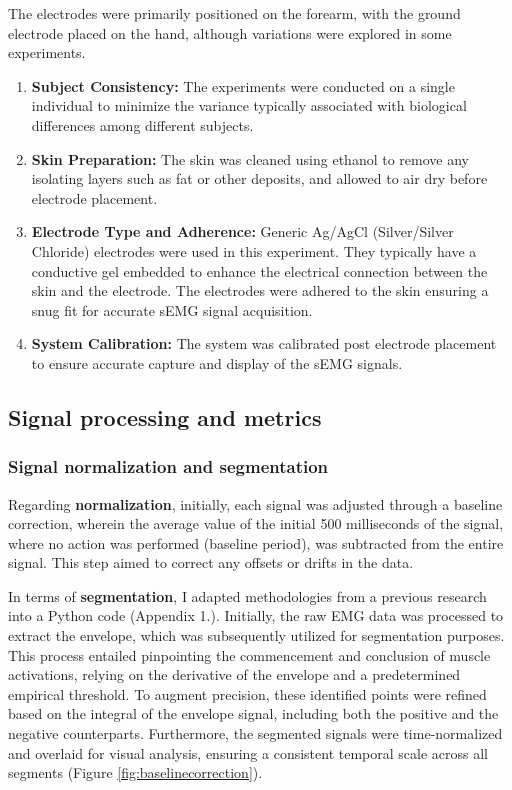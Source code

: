 \documentclass[conference]{IEEEtran}
\begin{document}
The electrodes were primarily positioned on the forearm, with the ground electrode 
placed on the hand, although variations were explored in some experiments. 

\begin{enumerate}
   \item \textbf{Subject Consistency:} 
   The experiments were conducted on a single individual to minimize the variance 
   typically associated with biological differences among different subjects.
   
   \item \textbf{Skin Preparation:} 
   The skin was cleaned using ethanol to remove any isolating layers such as fat 
   or other deposits, and allowed to air dry before electrode placement.
   
   \item \textbf{Electrode Type and Adherence:} 
   Generic Ag/AgCl (Silver/Silver Chloride) electrodes were used in this experiment. 
   They typically have a conductive gel embedded to enhance the 
   electrical connection between the skin and the electrode. The electrodes were adhered to the skin ensuring a snug fit for accurate sEMG 
   signal acquisition.
   
   \item \textbf{System Calibration:}
   The system was calibrated post electrode placement to ensure accurate capture 
   and display of the sEMG signals.
\end{enumerate}


\subsection{Signal processing and metrics}
\subsubsection{Signal normalization and segmentation}
Regarding \textbf{normalization}, initially, each signal was adjusted through a baseline correction, 
wherein the average value of the initial 500 milliseconds of the signal, where no action was performed (baseline period), was subtracted from the entire signal. 
This step aimed to correct any offsets or drifts in the data.  

In terms of \textbf{segmentation}, I adapted methodologies from a previous research \cite{wangResearchEMGSegmentation2019} into a Python code 
(Appendix 1.). Initially, the raw EMG data was processed to extract the envelope, which was subsequently utilized for segmentation purposes.
 This process entailed pinpointing the commencement and conclusion of muscle activations, relying on the derivative of the envelope and a predetermined 
 empirical threshold. To augment precision, these identified points were refined based on the integral of the envelope signal, including both the positive 
 and the negative counterparts. Furthermore, the segmented signals were time-normalized and overlaid for
 visual analysis, ensuring a consistent temporal scale across all segments (Figure \ref{fig:baselinecorrection}). 
\end{document}
